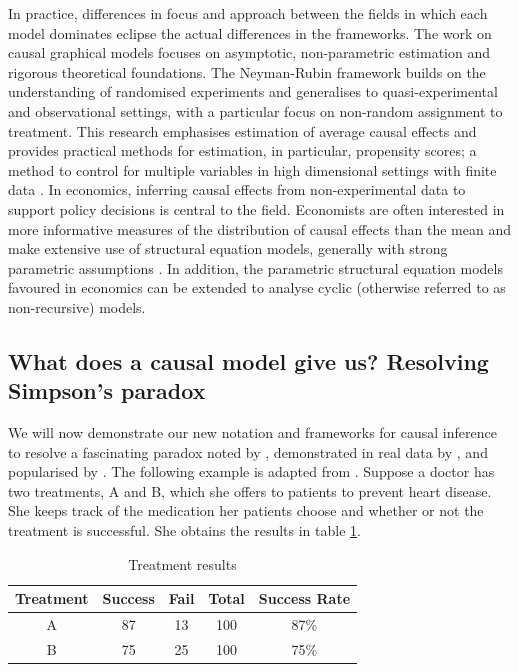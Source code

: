 \documentclass[11pt,a4paper,twoside]{report}
\theoremstyle{plain}
\theoremstyle{definition}
\begin{document}
In practice, differences in focus and approach between the fields in which each model dominates eclipse the actual differences in the frameworks. The work on causal graphical models \citep{Pearl2000,Sprites2000} focuses on asymptotic, non-parametric estimation and rigorous theoretical foundations. The Neyman-Rubin framework builds on the understanding of randomised experiments and generalises to quasi-experimental and observational settings, with a particular focus on non-random assignment to treatment. This research emphasises estimation of average causal effects and provides practical methods for estimation, in particular, propensity scores; a method to control for multiple variables in high dimensional settings with finite data \citep{Rosenbaum1983}. In economics, inferring causal effects from non-experimental data to support policy decisions is central to the field. Economists are often interested in more informative measures of the distribution of causal effects than the mean and make extensive use of structural equation models, generally with strong parametric assumptions \citep{Heckman2008}. In addition, the parametric structural equation models favoured in economics can be extended to analyse cyclic (otherwise referred to as non-recursive) models. 

\subsection{What does a causal model give us? Resolving Simpson's paradox}

We will now demonstrate our new notation and frameworks for causal inference to resolve a fascinating paradox noted by \citet{yule1903notes}, demonstrated in real data by \citet{Cohen1934}, and popularised by \citet{simpson1951interpretation}. The following example is adapted from \citet{Pearl2000}. Suppose a doctor has two treatments, A and B, which she offers to patients to prevent heart disease. She keeps track of the medication her patients choose and whether or not the treatment is successful. She obtains the results in table \ref{tab:simpson1}.

\begin{table}[ht]
\caption{Treatment results}
\label{tab:simpson1}
\center
\begin{tabular}{c c c c c}
Treatment & Success & Fail & Total & Success Rate\\
\hline
\rowcolor[gray]{0.9} 
A &  87 & 13 & 100 & 87\%\\
\rowcolor{white} B & 75 & 25 & 100 & 75\%\\
\hline
\end{tabular}
\end{table}
\end{document}
